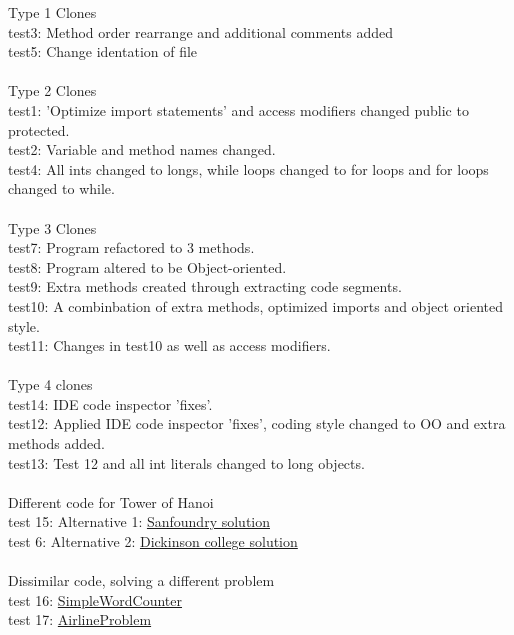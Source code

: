\begin{tabbing}
Type 1 Clones\\
test3: Method order rearrange and additional comments added\\
test5: Change identation of file\\

\\Type 2 Clones\\
test1: 'Optimize import statements' and access modifiers changed public to protected.\\
test2: Variable and method names changed.\\
test4: All ints changed to longs, while loops changed to for loops and for loops changed to while.\\

\\Type 3 Clones\\
test7: Program refactored to 3 methods.\\
test8: Program altered to be Object-oriented.\\
test9: Extra methods created through extracting code segments.\\
test10: A combinbation of extra methods, optimized imports and object oriented style.\\
test11: Changes in test10 as well as access modifiers.\\

\\Type 4 clones\\
test14: IDE code inspector 'fixes'.\\
test12: Applied IDE code inspector 'fixes', coding style changed to OO and extra methods added.\\
test13: Test 12 and all int literals changed to long objects.\\

\\Different code for Tower of Hanoi\\
test 15: Alternative 1: \href{http://www.sanfoundry.com/java-program-implement-solve-tower-of-hanoi-using-stacks/}{Sanfoundry solution}\\
test 6: Alternative 2:
\href{http://users.dickinson.edu/~braught/courses/cs132s03/code/TowerOfHanoi.src.html}{Dickinson college solution}\\

\\Dissimilar code, solving a different problem\\
test 16: \href{http://www.cs.utexas.edu/~scottm/cs307/javacode/codeSamples/SimpleWordCounter.java}{SimpleWordCounter}\\
test 17: \href{http://www.cs.utexas.edu/~scottm/cs307/javacode/codeSamples/AirlineProblem.java}{AirlineProblem}\\
\end{tabbing}

 
\break



